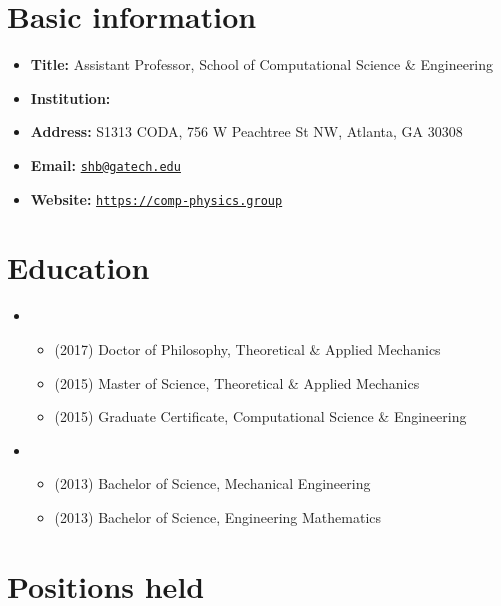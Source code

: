 \section{Basic information}
\begin{itemize}
    \item[] \textbf{Title:} Assistant Professor, School of Computational Science \& Engineering
    \item[] \textbf{Institution:} \GIT
    \item[] \textbf{Address:} S1313 CODA, 756 W Peachtree St NW, Atlanta, GA 30308
    \item[] \textbf{Email:} \href{mailto:shb@gatech.edu}{\texttt{shb@gatech.edu}}
    \item[] \textbf{Website:} \href{https://comp-physics.group}{\texttt{https://comp-physics.group}}
\end{itemize}

\section{Education}

\begin{itemize}
    \item \UIUC
    \begin{itemize}
        \item[] (2017) Doctor of Philosophy, Theoretical \& Applied Mechanics
        \item[] (2015) Master of Science, Theoretical \& Applied Mechanics
        \item[] (2015) Graduate Certificate, Computational Science \& Engineering
    \end{itemize}
    \item \UMD
    \begin{itemize}
        \item[] (2013) Bachelor of Science, Mechanical Engineering
        \item[] (2013) Bachelor of Science, Engineering Mathematics
    \end{itemize}
\end{itemize}


\section{Positions held}

